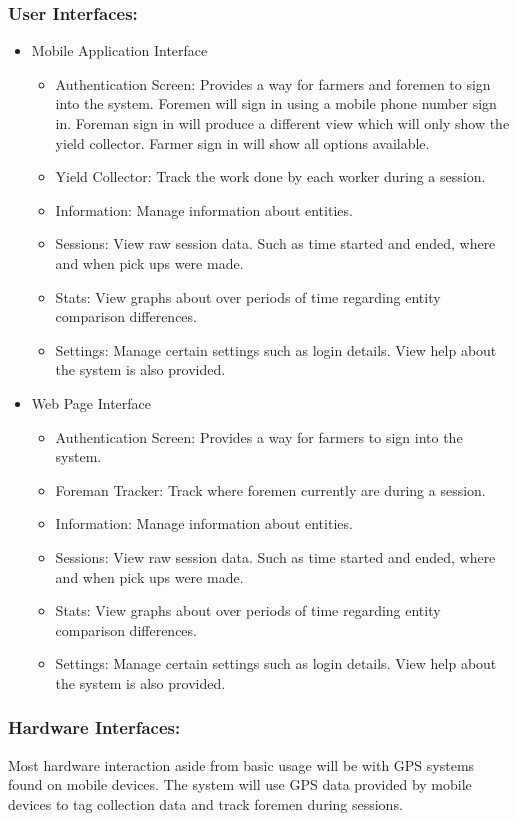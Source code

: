 \documentclass[11pt]{article}
\begin{document}
\subsubsection{User Interfaces:}
\begin{itemize}
\item Mobile Application Interface
	\begin{itemize}
	\item Authentication Screen: Provides a way for farmers and foremen to sign into the system. Foremen will sign in using a mobile phone number sign in. Foreman sign in will produce a different view which will only show the yield collector. Farmer sign in will show all options available.
	\item Yield Collector: Track the work done by each worker during a session.
	\item Information: Manage information about entities.
	\item Sessions: View raw session data. Such as time started and ended, where and when pick ups were made.
	\item Stats: View graphs about over periods of time regarding entity comparison differences.
	\item Settings: Manage certain settings such as login details. View help about the system is also provided.
	\end{itemize}
\item Web Page Interface
	\begin{itemize}
	\item Authentication Screen: Provides a way for farmers to sign into the system.
	\item Foreman Tracker: Track where foremen currently are during a session.
	\item Information: Manage information about entities.
	\item Sessions: View raw session data. Such as time started and ended, where and when pick ups were made.
	\item Stats: View graphs about over periods of time regarding entity comparison differences.
	\item Settings: Manage certain settings such as login details. View help about the system is also provided.
	\end{itemize}
\end{itemize}

\subsubsection{Hardware Interfaces:}
Most hardware interaction aside from basic usage will be with GPS systems found on mobile devices. The system will use GPS data provided by mobile devices to tag collection data and track foremen during sessions.
\end{document}
